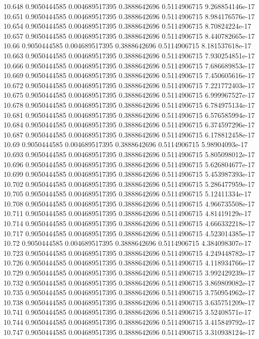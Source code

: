 {10.648 0.9050444585 0.004689517395 0.3888642696 0.5114906715 9.268854146e-17
10.651 0.9050444585 0.004689517395 0.3888642696 0.5114906715 8.984176576e-17
10.654 0.9050444585 0.004689517395 0.3888642696 0.5114906715 8.70824224e-17
10.657 0.9050444585 0.004689517395 0.3888642696 0.5114906715 8.440782665e-17
10.66 0.9050444585 0.004689517395 0.3888642696 0.5114906715 8.181537618e-17
10.663 0.9050444585 0.004689517395 0.3888642696 0.5114906715 7.930254851e-17
10.666 0.9050444585 0.004689517395 0.3888642696 0.5114906715 7.686689853e-17
10.669 0.9050444585 0.004689517395 0.3888642696 0.5114906715 7.450605616e-17
10.672 0.9050444585 0.004689517395 0.3888642696 0.5114906715 7.221772403e-17
10.675 0.9050444585 0.004689517395 0.3888642696 0.5114906715 6.999967527e-17
10.678 0.9050444585 0.004689517395 0.3888642696 0.5114906715 6.784975134e-17
10.681 0.9050444585 0.004689517395 0.3888642696 0.5114906715 6.576585994e-17
10.684 0.9050444585 0.004689517395 0.3888642696 0.5114906715 6.374597296e-17
10.687 0.9050444585 0.004689517395 0.3888642696 0.5114906715 6.178812458e-17
10.69 0.9050444585 0.004689517395 0.3888642696 0.5114906715 5.98904093e-17
10.693 0.9050444585 0.004689517395 0.3888642696 0.5114906715 5.805098012e-17
10.696 0.9050444585 0.004689517395 0.3888642696 0.5114906715 5.626804677e-17
10.699 0.9050444585 0.004689517395 0.3888642696 0.5114906715 5.453987393e-17
10.702 0.9050444585 0.004689517395 0.3888642696 0.5114906715 5.286477959e-17
10.705 0.9050444585 0.004689517395 0.3888642696 0.5114906715 5.12411334e-17
10.708 0.9050444585 0.004689517395 0.3888642696 0.5114906715 4.966735508e-17
10.711 0.9050444585 0.004689517395 0.3888642696 0.5114906715 4.81419129e-17
10.714 0.9050444585 0.004689517395 0.3888642696 0.5114906715 4.666332218e-17
10.717 0.9050444585 0.004689517395 0.3888642696 0.5114906715 4.523014385e-17
10.72 0.9050444585 0.004689517395 0.3888642696 0.5114906715 4.384098307e-17
10.723 0.9050444585 0.004689517395 0.3888642696 0.5114906715 4.249448782e-17
10.726 0.9050444585 0.004689517395 0.3888642696 0.5114906715 4.118934766e-17
10.729 0.9050444585 0.004689517395 0.3888642696 0.5114906715 3.992429239e-17
10.732 0.9050444585 0.004689517395 0.3888642696 0.5114906715 3.869809082e-17
10.735 0.9050444585 0.004689517395 0.3888642696 0.5114906715 3.750954962e-17
10.738 0.9050444585 0.004689517395 0.3888642696 0.5114906715 3.635751209e-17
10.741 0.9050444585 0.004689517395 0.3888642696 0.5114906715 3.52408571e-17
10.744 0.9050444585 0.004689517395 0.3888642696 0.5114906715 3.415849792e-17
10.747 0.9050444585 0.004689517395 0.3888642696 0.5114906715 3.310938124e-17
}
